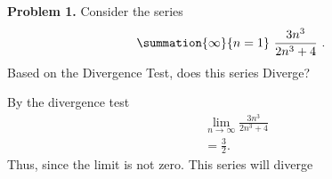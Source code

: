 \documentclass{report}
\title{\Huge{}}
\author{\huge{Nathan Warner}}
\date{\huge{}}
\begin{document}
    \begin{mdframed}
        \textbf{Problem 1.} Consider the series
        \begin{align*}
            \summation{\infty}{n=1}\ \frac{3n^{3}}{2n^{3}+4}\ 
        .\end{align*}
        Based on the Divergence Test, does this series Diverge?
    \end{mdframed}
    \bigbreak \noindent 
    By the divergence test
    \begin{align*}
        &\lim\limits_{n \to \infty}{\frac{3n^{3}}{2n^{3} +4}} \\
        &=\frac{3}{2}
    .\end{align*}
    \bigbreak \noindent 
    Thus, since the limit is not zero. This series will diverge
\end{document}
